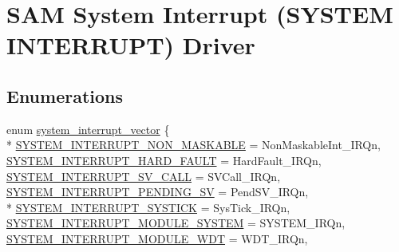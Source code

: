 \hypertarget{group__asfdoc__sam0__system__interrupt__group}{}\section{S\+A\+M System Interrupt (S\+Y\+S\+T\+E\+M I\+N\+T\+E\+R\+R\+U\+P\+T) Driver}
\label{group__asfdoc__sam0__system__interrupt__group}
\subsection*{Enumerations}
\begin{DoxyCompactItemize}
\item 
enum \hyperlink{group__asfdoc__sam0__system__interrupt__group_ga43378e6222cc05290c1a0c6a9ba125cf}{system\+\_\+interrupt\+\_\+vector} \{ \\*
\hyperlink{group__asfdoc__sam0__system__interrupt__group_gga43378e6222cc05290c1a0c6a9ba125cfa8967f7e5e661234c374fd8fe6a7c7b4a}{S\+Y\+S\+T\+E\+M\+\_\+\+I\+N\+T\+E\+R\+R\+U\+P\+T\+\_\+\+N\+O\+N\+\_\+\+M\+A\+S\+K\+A\+B\+L\+E} = Non\+Maskable\+Int\+\_\+\+I\+R\+Qn, 
\hyperlink{group__asfdoc__sam0__system__interrupt__group_gga43378e6222cc05290c1a0c6a9ba125cfabef47b275e187a3c4cc3d79fdefeb43a}{S\+Y\+S\+T\+E\+M\+\_\+\+I\+N\+T\+E\+R\+R\+U\+P\+T\+\_\+\+H\+A\+R\+D\+\_\+\+F\+A\+U\+L\+T} = Hard\+Fault\+\_\+\+I\+R\+Qn, 
\hyperlink{group__asfdoc__sam0__system__interrupt__group_gga43378e6222cc05290c1a0c6a9ba125cfa91a0f47299fac0d5a4bbd776a049a7a1}{S\+Y\+S\+T\+E\+M\+\_\+\+I\+N\+T\+E\+R\+R\+U\+P\+T\+\_\+\+S\+V\+\_\+\+C\+A\+L\+L} = S\+V\+Call\+\_\+\+I\+R\+Qn, 
\hyperlink{group__asfdoc__sam0__system__interrupt__group_gga43378e6222cc05290c1a0c6a9ba125cfa9aa2c667976293c6b9a0f046984696aa}{S\+Y\+S\+T\+E\+M\+\_\+\+I\+N\+T\+E\+R\+R\+U\+P\+T\+\_\+\+P\+E\+N\+D\+I\+N\+G\+\_\+\+S\+V} = Pend\+S\+V\+\_\+\+I\+R\+Qn, 
\\*
\hyperlink{group__asfdoc__sam0__system__interrupt__group_gga43378e6222cc05290c1a0c6a9ba125cfadef3a6521ea01f9fa669fa3951d97668}{S\+Y\+S\+T\+E\+M\+\_\+\+I\+N\+T\+E\+R\+R\+U\+P\+T\+\_\+\+S\+Y\+S\+T\+I\+C\+K} = Sys\+Tick\+\_\+\+I\+R\+Qn, 
\hyperlink{group__asfdoc__sam0__system__interrupt__group_gga43378e6222cc05290c1a0c6a9ba125cfac73f9b36d1b5d6db8b43f37982e90658}{S\+Y\+S\+T\+E\+M\+\_\+\+I\+N\+T\+E\+R\+R\+U\+P\+T\+\_\+\+M\+O\+D\+U\+L\+E\+\_\+\+S\+Y\+S\+T\+E\+M} = S\+Y\+S\+T\+E\+M\+\_\+\+I\+R\+Qn, 
\hyperlink{group__asfdoc__sam0__system__interrupt__group_gga43378e6222cc05290c1a0c6a9ba125cfa02ba7488cb2e602f86b42848bff250b4}{S\+Y\+S\+T\+E\+M\+\_\+\+I\+N\+T\+E\+R\+R\+U\+P\+T\+\_\+\+M\+O\+D\+U\+L\+E\+\_\+\+W\+D\+T} = W\+D\+T\+\_\+\+I\+R\+Qn, 

\end{DoxyCompactItemize}
